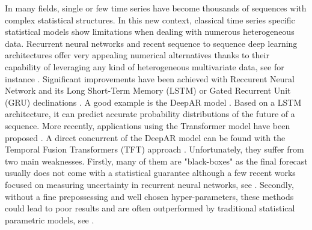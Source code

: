 \documentclass{article} %
\begin{document}

In many fields, single or few time series have become thousands of sequences with complex statistical structures. In this new context, classical time series specific statistical models show limitations when dealing with numerous heterogeneous data. Recurrent neural networks and recent sequence to sequence deep learning architectures offer very appealing numerical alternatives thanks to their capability of leveraging any kind of heterogeneous multivariate data, see for instance \citep{ hochreiter1997long,vaswani2017attention, salinas2020deepar, li2019enhancing, lim2019temporal}. %
Significant improvements have been achieved with Reccurent Neural Network and its Long Short-Term Memory (LSTM) or Gated Recurrent Unit (GRU)  declinations \citep{8614252}. 
A good example is the DeepAR model \citep{salinas2020deepar}. Based on a LSTM architecture, it can predict accurate probability distributions of the future of a sequence. More recently, applications using the Transformer model have been proposed  \citep{li2019enhancing}. A direct concurrent of the DeepAR model can be found with the Temporal Fusion Transformers (TFT) approach \citep{lim2019temporal}.  Unfortunately, they suffer from two main weaknesses. Firstly, many of them are "black-boxes"  as the final forecast usually does not come with a statistical guarantee  although a few recent works focused on measuring uncertainty in recurrent neural networks, see  \cite{martin2020monte}. Secondly, without a fine prepossessing and well chosen hyper-parameters, these methods could lead to poor results and are often outperformed by traditional statistical parametric models, see \cite{makridakis2018m4}.
\end{document}
